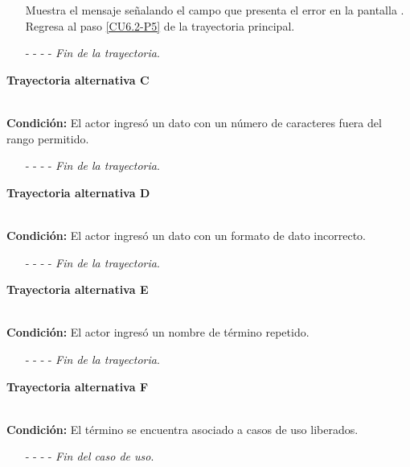 	\begin{enumerate}
		\UCpaso[\UCsist] Muestra el mensaje  señalando el campo que presenta el error en la pantalla .
		\UCpaso Regresa al paso \ref{CU6.2-P5} de la trayectoria principal.
		\item[- -] - - {\em {Fin de la trayectoria}}.%
	\end{enumerate}
	\hypertarget{CU6-2:TAC}{\textbf{Trayectoria alternativa C}}\\
	\noindent \textbf{Condición:} El actor ingresó un dato con un número de caracteres fuera del rango permitido.
	\begin{enumerate}
		\UCpaso[\UCsist] Muestra el mensaje  señalando el campo que presenta el error en la pantalla .
		\UCpaso Regresa al paso \ref{CU6.2-P5} de la trayectoria principal.
		\item[- -] - - {\em {Fin de la trayectoria}}.%
	\end{enumerate}
	\hypertarget{CU6-2:TAD}{\textbf{Trayectoria alternativa D}}\\
	\noindent \textbf{Condición:} El actor ingresó un dato con un formato de dato incorrecto.
	\begin{enumerate}
		\UCpaso[\UCsist] Muestra el mensaje  señalando el campo que presenta el error en la pantalla .
		\UCpaso Regresa al paso \ref{CU6.2-P5} de la trayectoria principal.
		\item[- -] - - {\em {Fin de la trayectoria}}.
	\end{enumerate}
	\hypertarget{CU6-2:TAE}{\textbf{Trayectoria alternativa E}}\\
	\noindent \textbf{Condición:} El actor ingresó un nombre de término repetido.
	\begin{enumerate}
		\UCpaso[\UCsist] Muestra el mensaje  señalando el campo que presenta la duplicidad en la pantalla .
		\UCpaso Regresa al paso \ref{CU6.2-P5} de la trayectoria principal.
		\item[- -] - - {\em {Fin de la trayectoria}}.
	\end{enumerate}
\hypertarget{CU6-2:TAF}{\textbf{Trayectoria alternativa F}}\\
\noindent \textbf{Condición:} El término se encuentra asociado a casos de uso liberados.
\begin{enumerate}
	\UCpaso[\UCsist] Oculta el botón \editar del término que esta asociado a casos de uso liberados.
	\item[- -] - - {\em {Fin del caso de uso}}.
\end{enumerate}